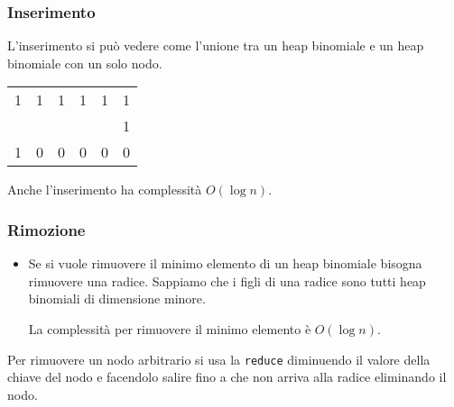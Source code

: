 \documentclass[a4paper]{article}
\begin{document}
\subsubsection{Inserimento}
L'inserimento si può vedere come l'unione tra un heap binomiale e un heap binomiale
con un solo nodo.
\begin{table}[H]
  \centering
  \begin{tabular}{cccccc}
    1 & 1 & 1 & 1 & 1 & 1 \\
      &   &   &   &   & 1 \\
    \hline
    1 & 0 & 0 & 0 & 0 & 0 \\
  \end{tabular}
\end{table}
Anche l'inserimento ha complessità \( O(\log n) \).

\subsubsection{Rimozione}
\begin{itemize}
  \item Se si vuole rimuovere il minimo elemento di un heap binomiale bisogna rimuovere
    una radice. Sappiamo che i figli di una radice sono tutti heap binomiali di dimensione
    minore.
    \begin{figure}[H]
      \centering
    \end{figure}

    \noindent
    La complessità per rimuovere il minimo elemento è \( O(\log n) \).
\end{itemize}

\vspace{1em}
\noindent
Per rimuovere un nodo arbitrario si usa la \texttt{reduce} diminuendo il valore della chiave
del nodo e facendolo salire fino a che non arriva alla radice eliminando il nodo.
\end{document}
